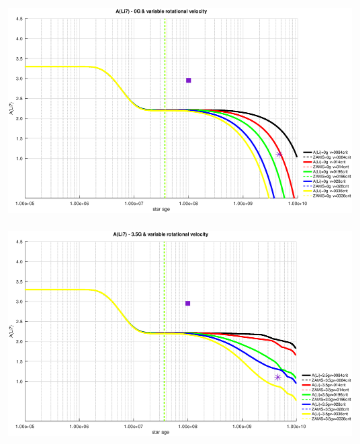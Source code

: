 \documentclass[fleqn,usenatbib]{mnras}
\begin{document}
\begin{figure}
    \centering
    \begin{subfigure}[h]{0.47\textwidth}
    \includegraphics[width=\textwidth]{figures/li_var_vel_0_0g.eps}
    \label{fig:subim1}
    \end{subfigure}
    \begin{subfigure}[h]{0.47\textwidth}
    \includegraphics[width=\textwidth]{figures/li_var_vel_3_5g.eps}
    \label{fig:subim2}
    \end{subfigure}
    

\end{figure}
\end{document}
